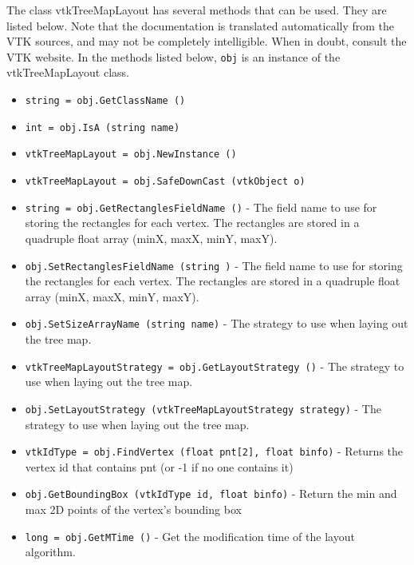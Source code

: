 The class vtkTreeMapLayout has several methods that can be used.
  They are listed below.
Note that the documentation is translated automatically from the VTK sources,
and may not be completely intelligible.  When in doubt, consult the VTK website.
In the methods listed below, \verb|obj| is an instance of the vtkTreeMapLayout class.
\begin{itemize}
\item  \verb|string = obj.GetClassName ()|

\item  \verb|int = obj.IsA (string name)|

\item  \verb|vtkTreeMapLayout = obj.NewInstance ()|

\item  \verb|vtkTreeMapLayout = obj.SafeDownCast (vtkObject o)|

\item  \verb|string = obj.GetRectanglesFieldName ()| -  The field name to use for storing the rectangles for each vertex.
 The rectangles are stored in a quadruple float array
 (minX, maxX, minY, maxY).

\item  \verb|obj.SetRectanglesFieldName (string )| -  The field name to use for storing the rectangles for each vertex.
 The rectangles are stored in a quadruple float array
 (minX, maxX, minY, maxY).

\item  \verb|obj.SetSizeArrayName (string name)| -  The strategy to use when laying out the tree map.

\item  \verb|vtkTreeMapLayoutStrategy = obj.GetLayoutStrategy ()| -  The strategy to use when laying out the tree map.

\item  \verb|obj.SetLayoutStrategy (vtkTreeMapLayoutStrategy strategy)| -  The strategy to use when laying out the tree map.

\item  \verb|vtkIdType = obj.FindVertex (float pnt[2], float binfo)| -  Returns the vertex id that contains pnt (or -1 if no one contains it)

\item  \verb|obj.GetBoundingBox (vtkIdType id, float binfo)| -  Return the min and max 2D points of the
 vertex's bounding box

\item  \verb|long = obj.GetMTime ()| -  Get the modification time of the layout algorithm.

\end{itemize}
